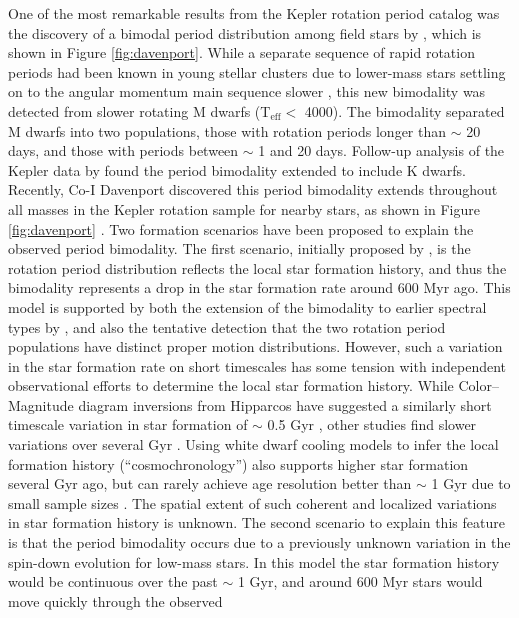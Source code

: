 \documentclass[useAMS, usenatbib, preprint, 12pt]{aastex}
\newcommand{\eg}{{\it e.g.}}
\begin{document}
One of the most remarkable results from the Kepler rotation period catalog was
the discovery of a bimodal period distribution among field stars by
\citet{mcquillan2013}, which is shown in Figure \ref{fig:davenport}.
While a separate sequence of rapid rotation periods had been known in young
stellar clusters due to lower-mass stars settling on to the angular momentum
main sequence slower \citep[\eg][]{barnes2007}, this new bimodality was
detected from slower rotating M dwarfs (T$_\mathrm{eff} <$ 4000).
The bimodality separated M dwarfs into two populations, those with rotation
periods longer than $\sim$ 20 days, and those with periods between $\sim$ 1
and 20 days.
Follow-up analysis of the Kepler data by \citet{mcquillan2014} found the
period bimodality extended to include K dwarfs.
Recently, Co-I Davenport discovered this period bimodality extends throughout
all masses in the Kepler rotation sample for nearby stars, as shown in Figure
\ref{fig:davenport} \citep{davenport2017}.
Two formation scenarios have been proposed to explain the observed period
bimodality.
The first scenario, initially proposed by \citet{mcquillan2013}, is the
rotation period distribution reflects the local star formation history, and
thus the bimodality represents a drop in the star formation rate around 600
Myr ago.
This model is supported by both the extension of the bimodality to earlier
spectral types by \citet{davenport2017}, and also the tentative detection that
the two rotation period populations have distinct proper motion distributions.
However, such a variation in the star formation rate on short timescales has
some tension with independent observational efforts to determine the local
star formation history.
While Color–Magnitude diagram inversions from Hipparcos have suggested a
similarly short timescale variation in star formation of $\sim$ 0.5 Gyr
\citep{hernandez2000}, other studies find slower variations over several
Gyr \citep[\eg][]{cignoni2006}.
Using white dwarf cooling models to infer the local formation history
(“cosmochronology”) also supports higher star formation several Gyr ago, but
can rarely achieve age resolution better than $\sim$ 1 Gyr due to small sample
sizes \citep{tremblay2014}.
The spatial extent of such coherent and localized variations in star formation
history is unknown.
The second scenario to explain this feature is that the period bimodality
occurs due to a previously unknown variation in the spin-down evolution for
low-mass stars.
In this model the star formation history would be continuous over the past
$\sim$ 1 Gyr, and around 600 Myr stars would move quickly through the observed
\end{document}

